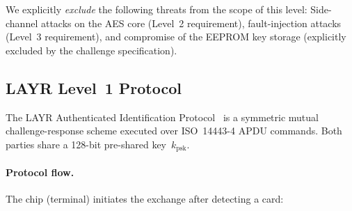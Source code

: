 \documentclass[manuscript,screen,nonacm]{acmart}
\begin{document}
We explicitly \emph{exclude} the following threats from the scope of
this level:
Side-channel attacks on the AES core (Level~2 requirement),
fault-injection attacks (Level~3 requirement),
and compromise of the EEPROM key storage (explicitly excluded by the
challenge specification).

\subsection{LAYR Level~1 Protocol}
\label{sec:security:protocol}

The LAYR Authenticated Identification Protocol~\cite{layr_javacard}
is a symmetric mutual challenge-response scheme executed over
ISO~14443-4 APDU commands.
Both parties share a 128-bit pre-shared key~$k_\text{psk}$.

\paragraph{Protocol flow.}
The chip (terminal) initiates the exchange after detecting a card:
\end{document}
